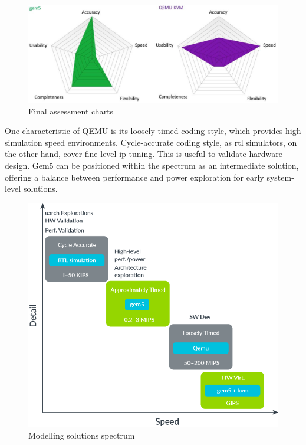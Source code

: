 \begin{figure}[H]
	\centering
 	\includegraphics[width=0.8\linewidth]{Images/gem5VSQEMU.png}
 	\caption{Final assessment charts \cite{morales2016evaluating}}
\end{figure}

One characteristic of QEMU is its loosely timed coding style, which provides high simulation speed environments. Cycle-accurate coding style, 
as \gls{rtl} simulators, on the other hand, cover fine-level \gls{ip} tuning. This is useful to validate hardware design. Gem5 can be positioned 
within the spectrum as an intermediate solution, offering a balance between performance and power exploration for early system-level solutions.

\begin{figure}[H]
	\centering
 	\includegraphics[width=0.6\linewidth]{Images/SimulationComparation.png}
 	\caption{ Modelling solutions spectrum \cite{herrera2020running}}
\end{figure}

